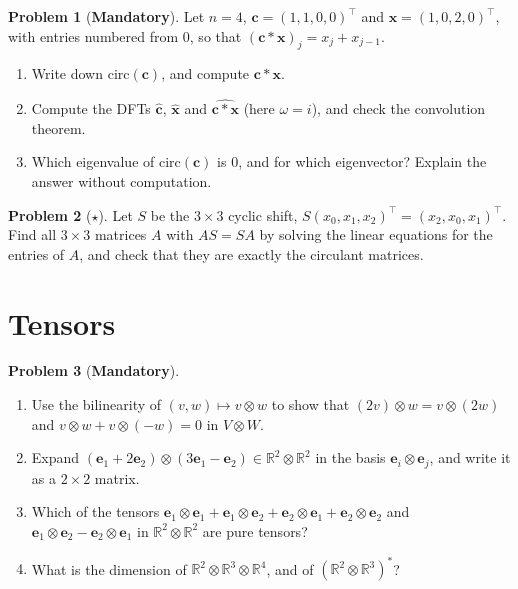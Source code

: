 \documentclass[11pt]{article}
\theoremstyle{definition}
\newtheorem{problem}{Problem}[section]
\newcommand{\mandatory}{\textcolor{red!70!black}{\textbf{Mandatory}}}
\begin{document}
\begin{problem}[\mandatory]\label{pr:circulant}
    Let $n = 4$, $\mathbf{c} = (1, 1, 0, 0)^\top$ and $\mathbf{x} = (1, 0, 2, 0)^\top$, with entries numbered from $0$, so that $(\mathbf{c} \ast \mathbf{x})_j = x_j + x_{j-1}$.
    \begin{enumerate}[label=(\alph*)]
        \item Write down $\mathrm{circ}(\mathbf{c})$, and compute $\mathbf{c} \ast \mathbf{x}$.
        \item Compute the DFTs $\hat{\mathbf{c}}$, $\hat{\mathbf{x}}$ and $\widehat{\mathbf{c} \ast \mathbf{x}}$ (here $\omega = i$), and check the convolution theorem.
        \item Which eigenvalue of $\mathrm{circ}(\mathbf{c})$ is $0$, and for which eigenvector? Explain the answer without computation.
    \end{enumerate}
\end{problem}

\begin{problem}[$\star$]\label{pr:shift-commute}
    Let $S$ be the $3 \times 3$ cyclic shift, $S(x_0, x_1, x_2)^\top = (x_2, x_0, x_1)^\top$. Find all $3 \times 3$ matrices $A$ with $AS = SA$ by solving the linear equations for the entries of $A$, and check that they are exactly the circulant matrices.
\end{problem}

\section{Tensors}

\begin{problem}[\mandatory]\label{pr:tensor-rules}
    \begin{enumerate}[label=(\alph*)]
        \item Use the bilinearity of $(v, w) \mapsto v \otimes w$ to show that $(2v) \otimes w = v \otimes (2w)$ and $v \otimes w + v \otimes (-w) = 0$ in $V \otimes W$.
        \item Expand $(\mathbf{e}_1 + 2\mathbf{e}_2) \otimes (3\mathbf{e}_1 - \mathbf{e}_2) \in \mathbb{R}^2 \otimes \mathbb{R}^2$ in the basis $\mathbf{e}_i \otimes \mathbf{e}_j$, and write it as a $2 \times 2$ matrix.
        \item Which of the tensors $\mathbf{e}_1 \otimes \mathbf{e}_1 + \mathbf{e}_1 \otimes \mathbf{e}_2 + \mathbf{e}_2 \otimes \mathbf{e}_1 + \mathbf{e}_2 \otimes \mathbf{e}_2$ and $\mathbf{e}_1 \otimes \mathbf{e}_2 - \mathbf{e}_2 \otimes \mathbf{e}_1$ in $\mathbb{R}^2 \otimes \mathbb{R}^2$ are pure tensors?
        \item What is the dimension of $\mathbb{R}^2 \otimes \mathbb{R}^3 \otimes \mathbb{R}^4$, and of $(\mathbb{R}^2 \otimes \mathbb{R}^3)^*$?
    \end{enumerate}
\end{problem}
\end{document}
